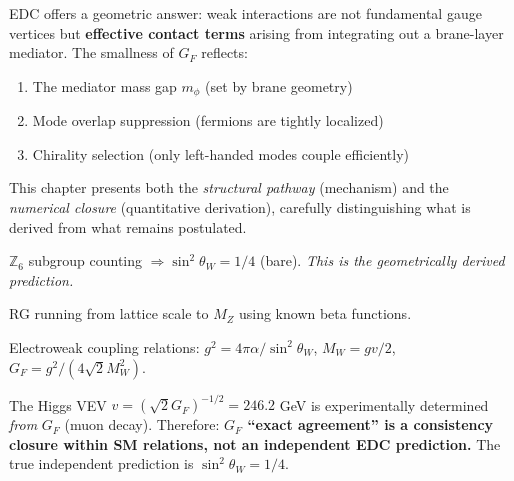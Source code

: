 EDC offers a geometric answer: weak interactions are not fundamental gauge vertices
but \textbf{effective contact terms} arising from integrating out a brane-layer
mediator. The smallness of $G_F$ reflects:
\begin{enumerate}[nosep]
    \item The mediator mass gap $m_\phi$ (set by brane geometry)
    \item Mode overlap suppression (fermions are tightly localized)
    \item Chirality selection (only left-handed modes couple efficiently)
\end{enumerate}

This chapter presents both the \emph{structural pathway} (mechanism) and the
\emph{numerical closure} (quantitative derivation), carefully distinguishing what
is derived from what remains postulated.


\begin{tcolorbox}[colback=green!5, colframe=green!50!black,
    title=\textbf{Derivation Chain: What Is Independent vs.\ What Is Not}]
\begin{description}[style=nextline, leftmargin=1em, font=\normalfont\bfseries]
    \item[Independent EDC step \tagDer{}:]
        $\mathbb{Z}_6$ subgroup counting $\Rightarrow \sin^2\theta_W = 1/4$ (bare).
        \emph{This is the geometrically derived prediction.}

    \item[Standard physics step \tagBL{}:]
        RG running from lattice scale to $M_Z$ using known beta functions.

    \item[Derived identities \tagDc{}:]
        Electroweak coupling relations: $g^2 = 4\pi\alpha/\sin^2\theta_W$,
        $M_W = gv/2$, $G_F = g^2/(4\sqrt{2}M_W^2)$.

    \item[Circularity caveat (important):]
        The Higgs VEV $v = (\sqrt{2}G_F)^{-1/2} = 246.2$ GeV is experimentally
        determined \emph{from} $G_F$ (muon decay). Therefore:
        \textbf{$G_F$ ``exact agreement'' is a consistency closure within
        SM relations, not an independent EDC prediction.}
        The true independent prediction is $\sin^2\theta_W = 1/4$.
\end{description}
\end{tcolorbox}

